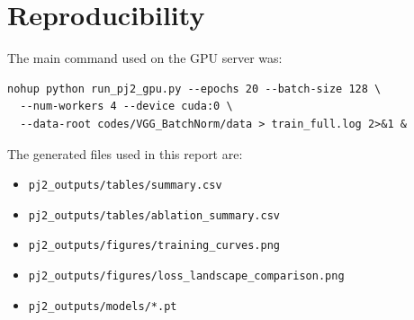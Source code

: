 \documentclass[11pt,a4paper]{article}
\begin{document}
\appendix
\section{Reproducibility}

The main command used on the GPU server was:
\begin{verbatim}
nohup python run_pj2_gpu.py --epochs 20 --batch-size 128 \
  --num-workers 4 --device cuda:0 \
  --data-root codes/VGG_BatchNorm/data > train_full.log 2>&1 &
\end{verbatim}

The generated files used in this report are:
\begin{itemize}
    \item \texttt{pj2\_outputs/tables/summary.csv}
    \item \texttt{pj2\_outputs/tables/ablation\_summary.csv}
    \item \texttt{pj2\_outputs/figures/training\_curves.png}
    \item \texttt{pj2\_outputs/figures/loss\_landscape\_comparison.png}
    \item \texttt{pj2\_outputs/models/*.pt}
\end{itemize}
\end{document}

